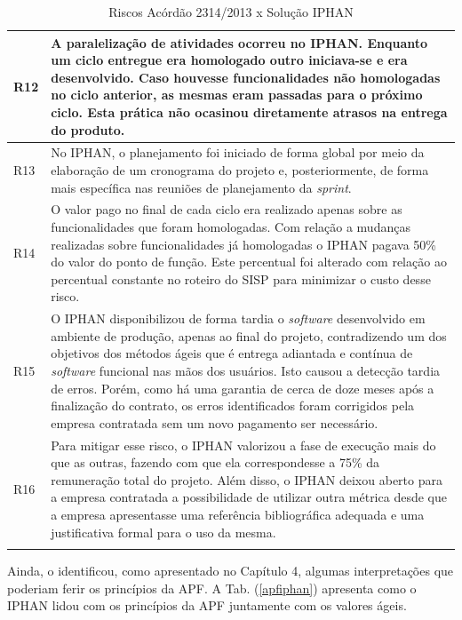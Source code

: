 \begin{longtable}{|p{2cm}|p{13cm}|}
R12                                                               & A paralelização de atividades ocorreu no IPHAN. Enquanto um ciclo entregue era homologado outro iniciava-se e era desenvolvido. Caso houvesse funcionalidades não homologadas no ciclo anterior, as mesmas eram passadas para o próximo ciclo. Esta prática não ocasinou diretamente atrasos na entrega do produto.             \\ \hline
R13                                                               & No IPHAN, o planejamento foi iniciado de forma global por meio da elaboração de um cronograma do projeto e, posteriormente, de forma mais específica nas reuniões de planejamento da \textit{sprint}.             \\ \hline
R14                                                               & O valor pago no final de cada ciclo era realizado apenas sobre as funcionalidades que foram homologadas. Com relação a mudanças realizadas sobre funcionalidades já homologadas o IPHAN pagava 50\% do valor do ponto de função. Este percentual foi alterado com relação ao percentual constante no roteiro do SISP para minimizar o custo desse risco.           \\ \hline
R15                                                               & O IPHAN disponibilizou de forma tardia o \textit{software} desenvolvido em ambiente de produção, apenas ao final do projeto, contradizendo um dos objetivos dos métodos ágeis  que é entrega adiantada e contínua de \textit{software} funcional nas mãos dos usuários. Isto causou a detecção tardia de erros. Porém, como há uma garantia de cerca de doze meses após a finalização do contrato, os erros identificados foram corrigidos pela empresa contratada sem um novo pagamento ser necessário.             \\ \hline
R16                                                               &  Para mitigar esse risco, o IPHAN valorizou a fase de execução mais do que as outras, fazendo com que ela correspondesse a 75\% da remuneração total do projeto. Além disso, o IPHAN deixou aberto para a empresa contratada a possibilidade de utilizar outra métrica desde que a empresa apresentasse uma referência bibliográfica adequada e uma justificativa formal para o uso da mesma.              \\ \hline

\caption{Riscos Acórdão 2314/2013 x Solução IPHAN}
		\label{riscosiphan}
\end{longtable}

Ainda, o  identificou, como apresentado no Capítulo 4, algumas interpretações que poderiam ferir os princípios da APF. A Tab. (\ref{apfiphan}) apresenta como o IPHAN lidou com os princípios da APF juntamente com os valores ágeis.

